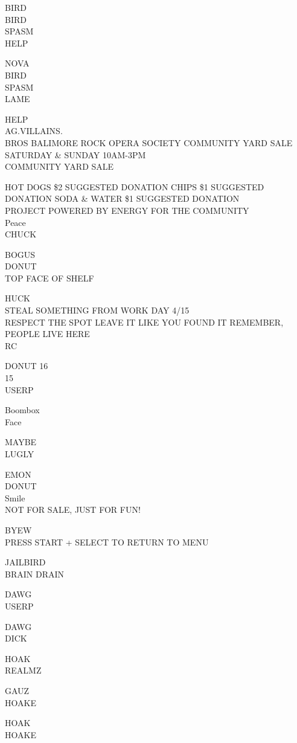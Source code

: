 \documentclass[10pt,letterpaper]{article}
\begin{document}
BIRD\\
BIRD\\
SPASM\\
HELP

NOVA\\
BIRD\\
SPASM\\
LAME

HELP\\
AG.VILLAINS.\\
BROS BALIMORE ROCK OPERA SOCIETY COMMUNITY YARD SALE SATURDAY \& SUNDAY 10AM{-}3PM\\
COMMUNITY YARD SALE

HOT DOGS \$2 SUGGESTED DONATION CHIPS \$1 SUGGESTED DONATION SODA \& WATER \$1 SUGGESTED DONATION\\
PROJECT POWERED BY ENERGY FOR THE COMMUNITY\\
Peace\\
CHUCK

BOGUS\\
DONUT\\
TOP FACE OF SHELF

HUCK\\
STEAL SOMETHING FROM WORK DAY 4/15\\
RESPECT THE SPOT LEAVE IT LIKE YOU FOUND IT REMEMBER, PEOPLE LIVE HERE\\
RC

DONUT 16\\
15\\
USERP

Boombox\\
Face

MAYBE\\
LUGLY

EMON\\
DONUT\\
Smile\\
NOT FOR SALE, JUST FOR FUN!

BYEW\\
PRESS START + SELECT TO RETURN TO MENU

JAILBIRD\\
BRAIN DRAIN

DAWG\\
USERP

DAWG\\
DICK

HOAK\\
REALMZ

GAUZ\\
HOAKE

HOAK\\
HOAKE
\end{document}
